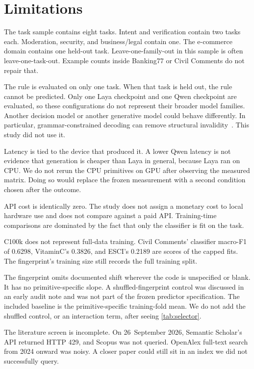 \section{Limitations}
\label{sec:limitations}

The task sample contains eight tasks. Intent and verification contain two tasks each. Moderation, security, and business/legal contain one. The e-commerce domain contains one held-out task. Leave-one-family-out in this sample is often leave-one-task-out. Example counts inside Banking77 or Civil Comments do not repair that.

The rule is evaluated on only one task. When that task is held out, the rule cannot be predicted. Only one Laya checkpoint and one Qwen checkpoint are evaluated, so these configurations do not represent their broader model families. Another decision model or another generative model could behave differently. In particular, grammar-constrained decoding can remove structural invalidity~\citep{chavan2026}. This study did not use it.

Latency is tied to the device that produced it. A lower Qwen latency is not evidence that generation is cheaper than Laya in general, because Laya ran on CPU. We do not rerun the CPU primitives on GPU after observing the measured matrix. Doing so would replace the frozen measurement with a second condition chosen after the outcome.

API cost is identically zero. The study does not assign a monetary cost to local hardware use and does not compare against a paid API. Training-time comparisons are dominated by the fact that only the classifier is fit on the task.

C100k does not represent full-data training. Civil Comments' classifier macro-F1 of 0.6298, VitaminC's 0.3826, and ESCI's 0.2189 are scores of the capped fits. The fingerprint's training size still records the full training split.

The fingerprint omits documented shift wherever the code is unspecified or blank. It has no primitive-specific slope. A shuffled-fingerprint control was discussed in an early audit note and was not part of the frozen predictor specification. The included baseline is the primitive-specific training-fold mean. We do not add the shuffled control, or an interaction term, after seeing \cref{tab:selector}.

The literature screen is incomplete. On 26~September 2026, Semantic Scholar's API returned HTTP 429, and Scopus was not queried. OpenAlex full-text search from 2024 onward was noisy. A closer paper could still sit in an index we did not successfully query.

